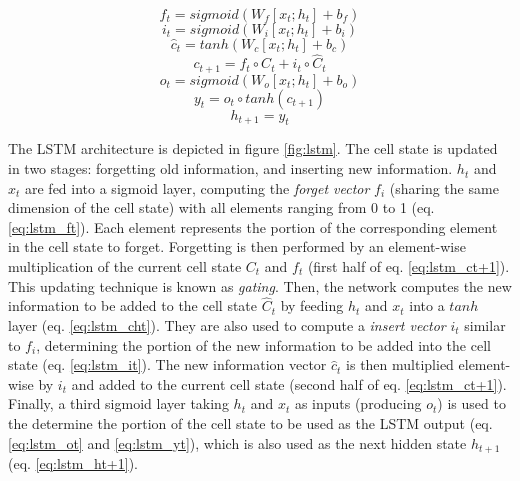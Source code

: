 \begin{equation}
   f_t = sigmoid(W_f[x_t;h_t] + b_f) 
   \label{eq:lstm_ft}
\end{equation}
\begin{equation}
   i_t = sigmoid(W_i[x_t;h_t] + b_i)
   \label{eq:lstm_it}
\end{equation}
\begin{equation}
   \hat{c}_t = tanh(W_c[x_t;h_t] + b_c)
   \label{eq:lstm_cht}
\end{equation}
\begin{equation}
   c_{t + 1} = f_t \circ C_t + i_t \circ \hat{C}_t
   \label{eq:lstm_ct+1}
\end{equation}
\begin{equation}
   o_t = sigmoid(W_o[x_t;h_t] + b_o)
   \label{eq:lstm_ot}
\end{equation}
\begin{equation}
   y_t = o_t \circ tanh(c_{t + 1})
   \label{eq:lstm_yt}
\end{equation}
\begin{equation}
   h_{t + 1} = y_t
   \label{eq:lstm_ht+1}
\end{equation}

The LSTM architecture is depicted in figure \ref{fig:lstm}. The cell state is updated in two stages: forgetting old information, and inserting new information. $h_t$ and $x_t$ are fed into a sigmoid layer, computing the \emph{forget vector} $f_i$ (sharing the same dimension of the cell state) with all elements ranging from 0 to 1 (eq. \ref{eq:lstm_ft}). Each element represents the portion of the corresponding element in the cell state to forget. Forgetting is then performed by an element-wise multiplication of the current cell state $C_t$ and $f_t$ (first half of eq. \ref{eq:lstm_ct+1}). This updating technique is known as \emph{gating}. 
Then, the network computes the new information to be added to the cell state $\hat{C}_t$ by feeding $h_t$ and $x_t$ into a $tanh$ layer (eq. \ref{eq:lstm_cht}). They are also used to compute a \emph{insert vector} $i_t$ similar to $f_i$, determining the portion of the new information to be added into the cell state (eq. \ref{eq:lstm_it}). The new information vector $\hat{c}_t$ is then multiplied element-wise by $i_t$ and added to the current cell state (second half of eq. \ref{eq:lstm_ct+1}).
Finally, a third sigmoid layer taking $h_t$ and $x_t$ as inputs (producing $o_t$) is used to the determine the portion of the cell state to be used as the LSTM output (eq. \ref{eq:lstm_ot} and \ref{eq:lstm_yt}), which is also used as the next hidden state $h_{t+1}$ (eq. \ref{eq:lstm_ht+1}). 

